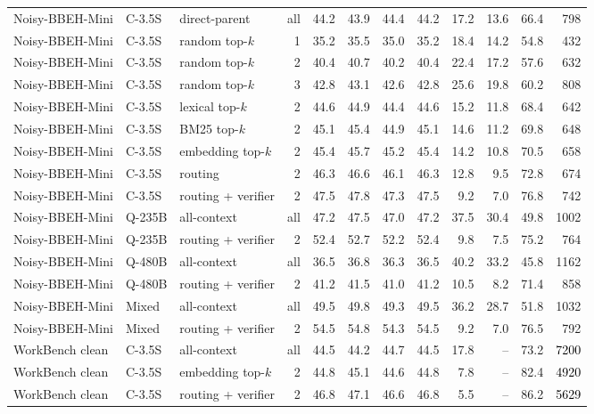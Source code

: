 \begin{longtable}{lllrrrrrrrrr}
Noisy-BBEH-Mini & C-3.5S & direct-parent & all & 44.2 & 43.9 & 44.4 & 44.2 & 17.2 & 13.6 & 66.4 & 798 \\
Noisy-BBEH-Mini & C-3.5S & random top-$k$ & 1 & 35.2 & 35.5 & 35.0 & 35.2 & 18.4 & 14.2 & 54.8 & 432 \\
Noisy-BBEH-Mini & C-3.5S & random top-$k$ & 2 & 40.4 & 40.7 & 40.2 & 40.4 & 22.4 & 17.2 & 57.6 & 632 \\
Noisy-BBEH-Mini & C-3.5S & random top-$k$ & 3 & 42.8 & 43.1 & 42.6 & 42.8 & 25.6 & 19.8 & 60.2 & 808 \\
Noisy-BBEH-Mini & C-3.5S & lexical top-$k$ & 2 & 44.6 & 44.9 & 44.4 & 44.6 & 15.2 & 11.8 & 68.4 & 642 \\
Noisy-BBEH-Mini & C-3.5S & BM25 top-$k$ & 2 & 45.1 & 45.4 & 44.9 & 45.1 & 14.6 & 11.2 & 69.8 & 648 \\
Noisy-BBEH-Mini & C-3.5S & embedding top-$k$ & 2 & 45.4 & 45.7 & 45.2 & 45.4 & 14.2 & 10.8 & 70.5 & 658 \\
Noisy-BBEH-Mini & C-3.5S & \method{} routing & 2 & 46.3 & 46.6 & 46.1 & 46.3 & 12.8 & 9.5 & 72.8 & 674 \\
\rowcolor{tracesoft}
Noisy-BBEH-Mini & C-3.5S & \method{} routing + verifier & 2 & 47.5 & 47.8 & 47.3 & 47.5 & 9.2 & 7.0 & 76.8 & 742 \\
\midrule
Noisy-BBEH-Mini & Q-235B & all-context & all & 47.2 & 47.5 & 47.0 & 47.2 & 37.5 & 30.4 & 49.8 & 1002 \\
Noisy-BBEH-Mini & Q-235B & \method{} routing + verifier & 2 & 52.4 & 52.7 & 52.2 & 52.4 & 9.8 & 7.5 & 75.2 & 764 \\
Noisy-BBEH-Mini & Q-480B & all-context & all & 36.5 & 36.8 & 36.3 & 36.5 & 40.2 & 33.2 & 45.8 & 1162 \\
Noisy-BBEH-Mini & Q-480B & \method{} routing + verifier & 2 & 41.2 & 41.5 & 41.0 & 41.2 & 10.5 & 8.2 & 71.4 & 858 \\
Noisy-BBEH-Mini & Mixed & all-context & all & 49.5 & 49.8 & 49.3 & 49.5 & 36.2 & 28.7 & 51.8 & 1032 \\
Noisy-BBEH-Mini & Mixed & \method{} routing + verifier & 2 & 54.5 & 54.8 & 54.3 & 54.5 & 9.2 & 7.0 & 76.5 & 792 \\
\midrule
WorkBench clean & C-3.5S & all-context & all & 44.5 & 44.2 & 44.7 & 44.5 & 17.8 & -- & 73.2 & \textcolor{black}{7200} \\
WorkBench clean & C-3.5S & embedding top-$k$ & 2 & 44.8 & 45.1 & 44.6 & 44.8 & 7.8 & -- & 82.4 & \textcolor{black}{4920} \\
WorkBench clean & C-3.5S & \method{} routing + verifier & 2 & 46.8 & 47.1 & 46.6 & 46.8 & 5.5 & -- & 86.2 & \textcolor{black}{5629} \\

\end{longtable}
